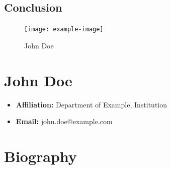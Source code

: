 \documentclass[twocolumn]{article}
\begin{document}
\begin{twocolumn}
\section{Conclusion}
\lipsum[5-6]

\printbibliography

\end{twocolumn}

\newcommand{\authorName}{John Doe}
\newcommand{\authorAffiliation}{Department of Example, Institution}
\newcommand{\authorBio}{
    \lipsum[1] %
}

\begin{figure}[htbp]
    \centering
    \texttt{[image: example-image]} %
    \caption{\authorName}
\end{figure}

\section*{\authorName}
\begin{itemize}
    \item \textbf{Affiliation:} \authorAffiliation
    \item \textbf{Email:} john.doe@example.com
\end{itemize}

\section*{Biography}
\authorBio
\end{document}
